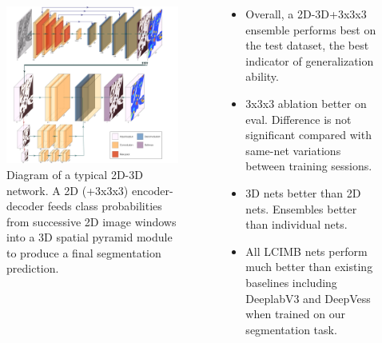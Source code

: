 \documentclass[final]{beamer}
\newlength{\onecolwid}
\newlength{\twocolwid}
\renewcommand{\emph}[1]{{\color{nibib2} #1}}
\begin{document}
\begin{frame}[t]
\begin{columns}[t]
\begin{column}{\twocolwid}
\begin{columns}[t]
\begin{column}{\onecolwid}
\begin{tcolorbox}[title=Methods]
\begin{itemize}
            \end{itemize}
        \end{tcolorbox}
    \begin{center}
        \begin{figure}
        \includegraphics[width=\linewidth]{fig/fullnet-rearranged.png}
        \caption{Diagram of a typical 2D-3D network. A 2D (+3x3x3) encoder-decoder feeds class probabilities from successive 2D image windows into a 3D spatial pyramid module to produce a final segmentation prediction.}
        \end{figure}
    \end{center}
    \end{column}
    \begin{column}{\onecolwid}
    	\begin{tcolorbox}[title=Results]
    	\begin{itemize}
    	\item Overall, a \emph{2D-3D+3x3x3} ensemble performs best on the test dataset, the best indicator of generalization ability. 
    	\item 3x3x3 ablation better on eval. Difference is not significant compared with same-net variations between training sessions.
    	\item 3D nets better than 2D nets. Ensembles better than individual nets.
    	\item All LCIMB nets perform much better than existing baselines including DeeplabV3 and DeepVess when trained on our segmentation task.
    	\end{itemize}
    	\end{tcolorbox}
    	

\end{column}
\end{columns}
\end{column}
\end{columns}
\end{frame}
\end{document}
